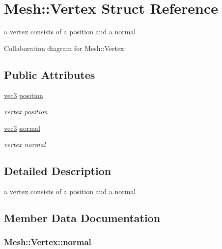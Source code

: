 \hypertarget{structMesh_1_1Vertex}{}\section{Mesh\+:\+:Vertex Struct Reference}
\label{structMesh_1_1Vertex}


a vertex consists of a position and a normal  




Collaboration diagram for Mesh\+:\+:Vertex\+:
\subsection*{Public Attributes}
\begin{DoxyCompactItemize}
\item 
\hyperlink{classvec3}{vec3} \hyperlink{structMesh_1_1Vertex_a6ee1c5ba29f0bf02bf446845de25548f}{position}
\begin{DoxyCompactList}\small\item\em vertex position \end{DoxyCompactList}\item 
\hyperlink{classvec3}{vec3} \hyperlink{structMesh_1_1Vertex_adf43225146648954d9196e4b6fa47379}{normal}
\begin{DoxyCompactList}\small\item\em vertex normal \end{DoxyCompactList}\end{DoxyCompactItemize}


\subsection{Detailed Description}
a vertex consists of a position and a normal 

\subsection{Member Data Documentation}
\subsubsection[{\texorpdfstring{normal}{normal}}]{ Mesh\+::\+Vertex\+::normal}\hypertarget{structMesh_1_1Vertex_adf43225146648954d9196e4b6fa47379}{}\label{structMesh_1_1Vertex_adf43225146648954d9196e4b6fa47379}


